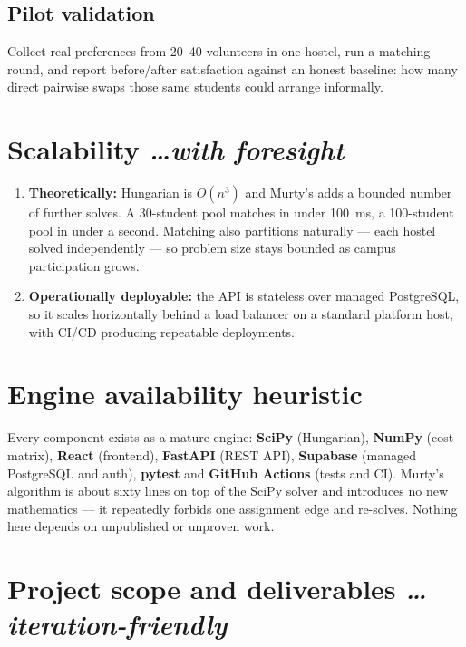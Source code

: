 \documentclass[11pt,a4paper]{article}
\newcommand{\BvrHint}[1]{%
  {\normalfont\normalsize\itshape\hfill #1}}
\begin{document}
\subsection{Pilot validation}
Collect real preferences from 20--40 volunteers in one
hostel, run a matching round, and report before/after
satisfaction against an honest baseline: how many direct
pairwise swaps those same students could arrange
informally.

\section{Scalability %
\BvrHint{\ldots with foresight}}
\begin{enumerate}[leftmargin=0.7cm]
    \item \textbf{Theoretically:} Hungarian is $O(n^3)$
      and Murty's adds a bounded number of further
      solves. A 30-student pool matches in under
      100~ms, a 100-student pool in under a second.
      Matching also partitions naturally --- each hostel
      solved independently --- so problem size stays
      bounded as campus participation grows.
    \item \textbf{Operationally deployable:} the API is
      stateless over managed PostgreSQL, so it scales
      horizontally behind a load balancer on a standard
      platform host, with CI/CD producing repeatable
      deployments.
\end{enumerate}

\section{Engine availability heuristic}
Every component exists as a mature engine:
\textbf{SciPy} (Hungarian), \textbf{NumPy} (cost
matrix), \textbf{React} (frontend), \textbf{FastAPI}
(REST API), \textbf{Supabase} (managed PostgreSQL and
auth), \textbf{pytest} and \textbf{GitHub Actions}
(tests and CI). Murty's algorithm is about sixty lines
on top of the SciPy solver and introduces no new
mathematics --- it repeatedly forbids one assignment edge
and re-solves. Nothing here depends on unpublished or
unproven work.

\section{Project scope and deliverables %
\BvrHint{\ldots iteration-friendly}}
\end{document}
